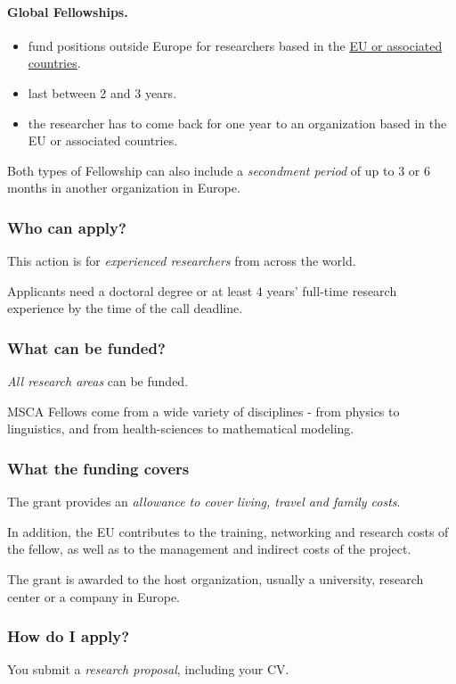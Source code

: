\documentclass[oneside]{book}
\numberwithin{equation}{section}
\begin{document}
\paragraph{Global Fellowships.}
\begin{itemize}
    \item fund positions outside Europe for researchers based in the \href{http://ec.europa.eu/research/participants/data/ref/h2020/other/wp/2016-2017/annexes/h2020-wp1617-annex-a-countries-rules_en.pdf}{EU or associated countries}.
    \item last between 2 and 3 years.
    \item the researcher has to come back for one year to an organization based in the EU or associated countries.
\end{itemize}
Both types of Fellowship can also include a \textit{secondment period} of up to 3 or 6 months in another organization in Europe.

\subsubsection{Who can apply?}
This action is for \textit{experienced researchers} from across the world.

%
Applicants need a doctoral degree or at least 4 years' full-time research experience by the time of the call deadline.

\subsubsection{What can be funded?}
\textit{All research areas} can be funded.

MSCA Fellows come from a wide variety of disciplines - from physics to linguistics, and from health-sciences to mathematical modeling.

\subsubsection{What the funding covers}
The grant provides an \textit{allowance to cover living, travel and family costs}.

In addition, the EU contributes to the training, networking and research costs of the fellow, as well as to the management and indirect costs of the project.

The grant is awarded to the host organization, usually a university, research center or a company in Europe.

\subsubsection{How do I apply?}
You submit a \textit{research proposal}, including your CV.
\end{document}
